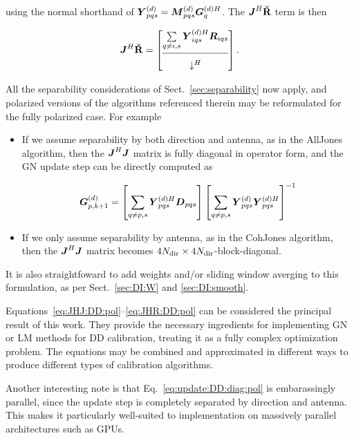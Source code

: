\documentclass[useAMS,usenatbib]{mn2e}
\newcommand{\mat}[1]{{\bmath{#1}}}
\newcommand{\JJ}{\mat{J}} %
\newcommand{\DD}{\mat{D}}
\newcommand{\RR}{\mat{R}}
\newcommand{\JHJ}{\JJ^H\JJ} %
\begin{document}
using the normal shorthand of $\YYd_{pqs} = \MMd_{pqs} \GGdH_q$. The $\JJ^H\RRr$ term is then

\newcommand{\CCC}{\mathcal{C}}

\begin{equation}
\label{eq:JHR:DD:pol}
\JJ^H\RRr = \Matrix{c}{
\sum\limits_{q\ne i,s} \YYdH_{iqs} \RR_{iqs} \\
\hline\\[-8pt]
\downarrow^H}.
\end{equation}

All the separability considerations of Sect.~\ref{sec:separability} now apply, and polarized versions of the 
algorithms referenced therein may be reformulated for the fully polarized case. For example

\begin{itemize} 

\item If we assume separability by both direction and antenna, as in the {\sc AllJones} algorithm, then
the $\JHJ$ matrix is fully diagonal in operator form, and the GN update step can be directly computed as

\begin{equation}
\label{eq:update:DD:diag:pol}
\GGd_{p,k+1} = \left [ \sum\limits_{q\ne p,s} \YYdH_{pqs} \DD_{pqs} \right ] 
\left [ \sum\limits_{q\ne p,s} \YYd_{pqs} \YYdH_{pqs}  \right ]^{-1}
\end{equation}

\item If we only assume separability by antenna, as in the {\sc CohJones} algorithm, then the $\JHJ$ matrix 
becomes $4N_\mathrm{dir}\times4N_\mathrm{dir}$-block-diagonal.
\end{itemize}

It is also straightfoward to add weights and/or sliding window averging to this formulation, as per 
Sect.~\ref{sec:DI:W} and \ref{sec:DI:smooth}.

Equations~\ref{eq:JHJ:DD:pol}--\ref{eq:JHR:DD:pol} can be considered the principal result of this work.
They provide the necessary ingredients for implementing GN or LM methods for DD calibration, treating it as a 
fully complex optimization problem. The equations may be combined and approximated in different 
ways to produce different types of calibration algorithms. 

Another interesting note is that Eq.~\ref{eq:update:DD:diag:pol} is embarassingly parallel, since the update step is 
completely separated by direction and antenna. This makes it particularly well-suited to implementation on massively 
parallel architectures such as GPUs.
\end{document}

